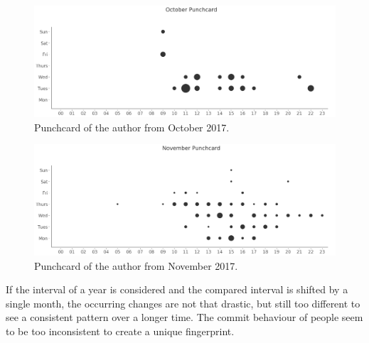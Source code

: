 \begin{figure}[H]
    \includegraphics[scale=0.32]{./graphs/analysis/october-punchcard}
    \centering
    \caption{Punchcard of the author from October 2017.}\label{fig:october-punchcard}
\end{figure}

\begin{figure}[H]
    \includegraphics[scale=0.32]{./graphs/analysis/november-punchcard}
    \centering
    \caption{Punchcard of the author from November 2017.}\label{fig:november-punchcard}
\end{figure}

If the interval of a year is considered and the compared interval is shifted by a single month, the occurring changes are not that drastic, but still too different to see a consistent pattern over a longer time.
The commit behaviour of people seem to be too inconsistent to create a unique fingerprint.
